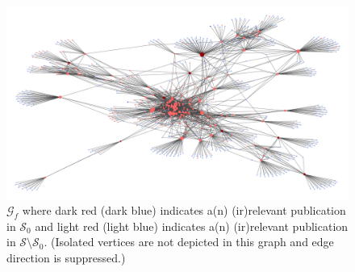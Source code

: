 \documentclass[11pt,a4paper]{book}
\theoremstyle{definition}
\theoremstyle{definition}
\theoremstyle{definition}
\theoremstyle{remark}
\newcommand{\pset}{S}
\newcommand{\xset}{\mathcal{S}}
\newcommand{\xsetz}{\mathcal{S}_{\mathit{0}}}
\newcommand{\tgraph}{\mathcal{G}_{f}}
\newcommand{\pgraph}{\mathcal{G}_{p}}
\begin{document}
\begin{figure}
\includegraphics[width=\textwidth]{whole_graph.png}
\caption{$\tgraph$ where \textcolor{start_relevant}{dark red}  (\textcolor{start_nrelevant}{dark blue}) indicates a(n) (ir)relevant publication in $\xsetz$ and \textcolor{other_relevant}{light red}  (\textcolor{other_nrelevant}{light blue}) indicates a(n) (ir)relevant publication in $\xset\setminus \xsetz$. (Isolated vertices are not depicted in this graph and edge direction is suppressed.)}
\label{fig:pgraph-whole_graph}
\end{figure}



\end{document}
